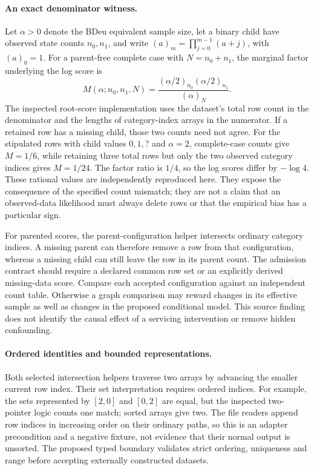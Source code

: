 \paragraph{An exact denominator witness.}
Let \(\alpha>0\) denote the BDeu equivalent sample size, let a binary child have
observed state counts \(n_0,n_1\), and write
\((a)_m=\prod_{j=0}^{m-1}(a+j)\), with \((a)_0=1\). For a parent-free complete
case with \(N=n_0+n_1\), the marginal factor underlying the log score is
\[
 M(\alpha;n_0,n_1,N)
 =\frac{(\alpha/2)_{n_0}(\alpha/2)_{n_1}}{(\alpha)_N}.
\]
The inspected root-score implementation uses the dataset's total row count in
the denominator and the lengths of category-index arrays in the numerator.
If a retained row has a missing child, those two counts need not agree. For the
stipulated rows with child values \(0,1,?\) and \(\alpha=2\), complete-case
counts give \(M=1/6\), while retaining three total rows but only the two observed
category indices gives \(M=1/24\). The factor ratio is \(1/4\), so the log scores
differ by \(-\log 4\). These rational values are independently reproduced here.
They expose the consequence of the specified count mismatch; they are not a claim
that an observed-data likelihood must always delete rows or that the empirical
bias has a particular sign.~\citep{exec28_blip_helpers,exec28_blip_helper_reference}

For parented scores, the parent-configuration helper intersects ordinary category
indices. A missing parent can therefore remove a row from that configuration,
whereas a missing child can still leave the row in its parent count. The admission
contract should require a declared common row set or an explicitly derived
missing-data score. Compare each accepted configuration against an independent
count table. Otherwise a graph comparison may reward changes in its effective
sample as well as changes in the proposed conditional model. This source finding
does not identify the causal effect of a servicing intervention or remove hidden
confounding.~\citep{exec28_blip_helpers}

\paragraph{Ordered identities and bounded representations.}
Both selected intersection helpers traverse two arrays by advancing the smaller
current row index. Their set interpretation requires ordered indices. For example,
the sets represented by \([2,0]\) and \([0,2]\) are equal, but the inspected
two-pointer logic counts one match; sorted arrays give two. The file readers append
row indices in increasing order on their ordinary paths, so this is an adapter
precondition and a negative fixture, not evidence that their normal output is
unsorted. The proposed typed boundary validates strict ordering, uniqueness and
range before accepting externally constructed datasets.~\citep{exec28_blip_helpers,exec28_blip_helper_reference}

